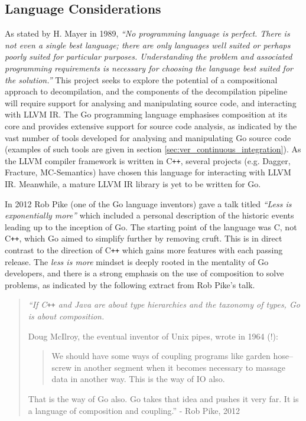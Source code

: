 

\subsection{Language Considerations}

As stated by H. Mayer in 1989, \textit{``No programming language is perfect. There is not even a single best language; there are only languages well suited or perhaps poorly suited for particular purposes. Understanding the problem and associated programming requirements is necessary for choosing the language best suited for the solution.''} \cite{no_perfect_lang_quote} This project seeks to explore the potential of a compositional approach to decompilation, and the components of the decompilation pipeline will require support for analysing and manipulating source code, and interacting with LLVM IR. The Go programming language emphasises composition at its core and provides extensive support for source code analysis, as indicated by the vast number of tools developed for analysing and manipulating Go source code (examples of such tools are given in section \ref{sec:ver_continuous_integration}). As the LLVM compiler framework is written in C\texttt{++}, several projects (e.g. Dagger, Fracture, MC-Semantics) have chosen this language for interacting with LLVM IR. Meanwhile, a mature LLVM IR library is yet to be written for Go.

In 2012 Rob Pike (one of the Go language inventors) gave a talk titled \textit{``Less is exponentially more''} which included a personal description of the historic events leading up to the inception of Go. The starting point of the language was C, not C\texttt{++}, which Go aimed to simplify further by removing cruft. This is in direct contrast to the direction of C\texttt{++} which gains more features with each passing release. The \textit{less is more} mindset is deeply rooted in the mentality of Go developers, and there is a strong emphasis on the use of composition to solve problems, as indicated by the following extract from Rob Pike's talk.

\begin{quote}
	\itshape
	``If C\texttt{++} and Java are about type hierarchies and the taxonomy of types, Go is about composition.

	Doug McIlroy, the eventual inventor of Unix pipes, wrote in 1964 (!):

	\begin{quote}
		We should have some ways of coupling programs like garden hose--screw in another segment when it becomes necessary to massage data in another way. This is the way of IO also.
	\end{quote}

	That is the way of Go also. Go takes that idea and pushes it very far. It is a language of composition and coupling.''
	\normalfont
	- Rob Pike, 2012 \cite{less_is_more}
\end{quote}

